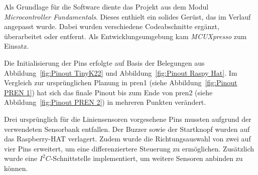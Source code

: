 Als Grundlage für die Software diente das Projekt aus dem Modul \textit{Microcontroller Fundamentals}. Dieses enthielt ein solides Gerüst, das im Verlauf angepasst wurde. Dabei wurden verschiedene Codeabschnitte ergänzt, überarbeitet oder entfernt. Als Entwicklungsumgebung kam \textit{MCUXpresso} zum Einsatz.

Die Initialisierung der Pins erfolgte auf Basis der Belegungen aus Abbildung~\ref{fig:Pinout TinyK22} und Abbildung~\ref{fig:Pinout Raspy Hat}. Im Vergleich zur ursprünglichen Planung in \gls{pren1} (siehe Abbildung~\ref{fig:Pinout PREN 1}) hat sich das finale Pinout bis zum Ende von \gls{pren2} (siehe Abbildung~\ref{fig:Pinout PREN 2}) in mehreren Punkten verändert.

Drei ursprünglich für die Liniensensoren vorgesehene Pins mussten aufgrund der verwendeten Sensorbank entfallen. Der Buzzer sowie der Startknopf wurden auf das Raspberry-HAT verlagert. Zudem wurde die Richtungsauswahl von zwei auf vier Pins erweitert, um eine differenziertere Steuerung zu ermöglichen. Zusätzlich wurde eine $I^2C$-Schnittstelle implementiert, um weitere Sensoren anbinden zu können.


